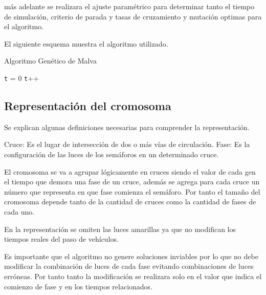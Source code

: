 más adelante se realizara el ajuste paramétrico para determinar tanto el tiempo de simulación, criterio de parada y tasas de cruzamiento y mutación optimas para el algoritmo.

El siguiente esquema muestra el algoritmo utilizado. \citep{MalvaAlgGenetico}

 
\begin{algorithm}[H]
	\caption{Algoritmo Genético de Malva}
	\label{alg:algoritmo_genetico_malva}
	\begin{algorithmic} [1] 
		{
			\STATE \texttt{t} = 0
			\STATE \texttt{t}++		
			\ENDWHILE
		}
	\end{algorithmic}

\end{algorithm}




 

\subsection{Representación del cromosoma}

Se explican algunas definiciones necesarias para comprender la representación.

Cruce: Es el lugar de intersección de dos o más vías de circulación.
Fase: Es la configuración de las luces de los semáforos en un determinado cruce.

El  cromosoma  se  va  a  agrupar  lógicamente  en  cruces siendo el valor de cada gen el tiempo que demora una
fase de un cruce, además se agrega para cada cruce un número que representa en que fase comienza el semáforo. 
Por tanto el tamaño del cromosoma depende tanto de la cantidad de cruces como la cantidad de fases de cada uno.

En la representación se omiten las luces amarillas ya que no modifican los tiempos reales del paso de vehículos.
 
Es  importante que el algoritmo no genere soluciones inviables por lo que no debe modificar la combinación de luces de cada fase evitando combinaciones de luces erróneas. Por tanto tanto la modificación se realizara solo en el valor que indica el comienzo de fase y en los tiempos relacionados.

